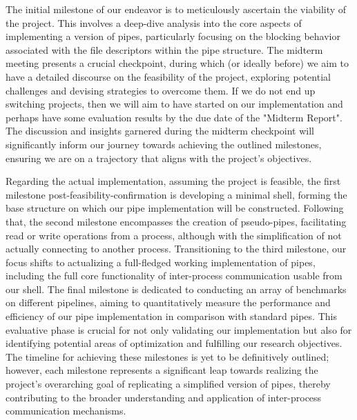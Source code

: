 The initial milestone of our endeavor is to meticulously ascertain the viability of the project. This involves a deep-dive analysis into the core aspects of implementing a version of pipes, particularly focusing on the blocking behavior associated with the file descriptors within the pipe structure. The midterm meeting presents a crucial checkpoint, during which (or ideally before) we aim to have a detailed discourse on the feasibility of the project, exploring potential challenges and devising strategies to overcome them.  If we do not end up switching projects, then we will aim to have started on our implementation and perhaps have some evaluation results by the due date of the "Midterm Report". The discussion and insights garnered during the midterm checkpoint will significantly inform our journey towards achieving the outlined milestones, ensuring we are on a trajectory that aligns with the project's objectives.

Regarding the actual implementation, assuming the project is feasible, the first milestone post-feasibility-confirmation is developing a minimal shell, forming the base structure on which our pipe implementation will be constructed. Following that, the second milestone encompasses the creation of pseudo-pipes, facilitating read or write operations from a process, although with the simplification of not actually connecting to another process. Transitioning to the third milestone, our focus shifts to actualizing a full-fledged working implementation of pipes, including the full core functionality of inter-process communication usable from our shell. The final milestone is dedicated to conducting an array of benchmarks on different pipelines, aiming to quantitatively measure the performance and efficiency of our pipe implementation in comparison with standard pipes. This evaluative phase is crucial for not only validating our implementation but also for identifying potential areas of optimization and fulfilling our research objectives. The timeline for achieving these milestones is yet to be definitively outlined; however, each milestone represents a significant leap towards realizing the project's overarching goal of replicating a simplified version of pipes, thereby contributing to the broader understanding and application of inter-process communication mechanisms.





